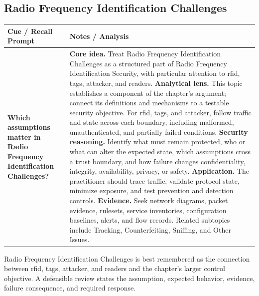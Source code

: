 \documentclass[11pt]{article}
\newcommand{\CornellHeader}{%
\rowcolor{Navy}\color{white}\bfseries Cue / Recall Prompt & \color{white}\bfseries Notes / Analysis\\\hline}
\newcommand{\CornellRow}[2]{%
\cellcolor{CueGray}\RaggedRight\textbf{#1} & \RaggedRight #2\\\hline}
\begin{document}
\subsection*{Radio Frequency Identification Challenges}
\begin{longtable}{>{\RaggedRight\arraybackslash}p{}|>{\RaggedRight\arraybackslash}p{}}
\CornellHeader
\CornellRow{Which assumptions matter in Radio Frequency Identification Challenges?}{\textbf{Core idea.} Treat Radio Frequency Identification Challenges as a structured part of Radio Frequency Identification Security, with particular attention to rfid, tags, attacker, and readers. \textbf{Analytical lens.} This topic establishes a component of the chapter's argument; connect its definitions and mechanisms to a testable security objective. For rfid, tags, and attacker, follow traffic and state across each boundary, including malformed, unauthenticated, and partially failed conditions. \textbf{Security reasoning.} Identify what must remain protected, who or what can alter the expected state, which assumptions cross a trust boundary, and how failure changes confidentiality, integrity, availability, privacy, or safety. \textbf{Application.} The practitioner should trace traffic, validate protocol state, minimize exposure, and test prevention and detection controls. \textbf{Evidence.} Seek network diagrams, packet evidence, rulesets, service inventories, configuration baselines, alerts, and flow records. Related subtopics include Tracking, Counterfeiting, Sniffing, and Other Issues.}
\end{longtable}
\begin{topicsummary}
Radio Frequency Identification Challenges is best remembered as the connection between rfid, tags, attacker, and readers and the chapter's larger control objective. A defensible review states the assumption, expected behavior, evidence, failure consequence, and required response.
\end{topicsummary}
\end{document}
